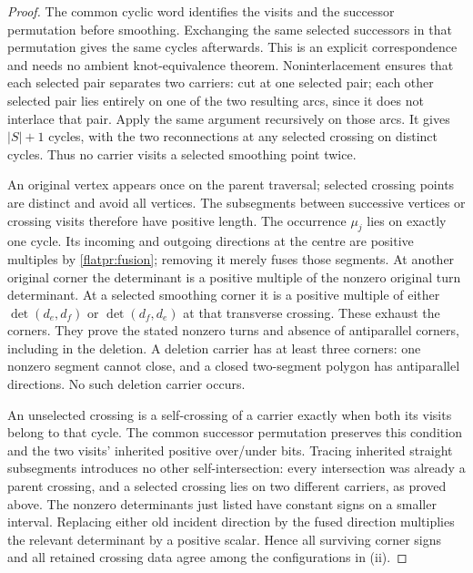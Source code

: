 \begin{proof}
The common cyclic word identifies the visits and the successor
permutation before smoothing. Exchanging the same selected successors
in that permutation gives the same cycles afterwards. This is an
explicit correspondence and needs no ambient knot-equivalence theorem.
Noninterlacement ensures that each selected pair separates two carriers:
cut at one selected pair; each other selected pair lies entirely on one
of the two resulting arcs, since it does not interlace that pair.
Apply the same argument recursively on those arcs. It gives $|S|+1$
cycles, with the two reconnections at any selected crossing on distinct
cycles. Thus no carrier visits a selected smoothing point twice.

An original vertex appears once on the parent traversal; selected
crossing points are distinct and avoid all vertices. The subsegments
between successive vertices or crossing visits therefore have positive
length. The occurrence $\mu_j$ lies on exactly one cycle. Its incoming
and outgoing directions at the centre are positive multiples by
\eqref{flatpr:fusion}; removing it merely fuses those segments.
At another original corner the determinant is a positive multiple of
the nonzero original turn determinant. At a selected smoothing corner
it is a positive multiple of either $\det(d_e,d_f)$ or
$\det(d_f,d_e)$ at that transverse crossing. These exhaust the corners.
They prove the stated nonzero turns and absence of antiparallel corners,
including in the deletion. A deletion carrier has at least three
corners: one nonzero segment cannot close, and a closed two-segment
polygon has antiparallel directions. No such deletion carrier occurs.

An unselected crossing is a self-crossing of a carrier exactly when
both its visits belong to that cycle. The common successor permutation
preserves this condition and the two visits' inherited positive
over/under bits. Tracing inherited straight subsegments introduces no
other self-intersection: every intersection was already a parent
crossing, and a selected crossing lies on two different carriers, as
proved above. The nonzero determinants just listed have constant
signs on a smaller interval. Replacing either old incident direction
by the fused direction multiplies the relevant determinant by a
positive scalar. Hence all surviving corner signs and all retained
crossing data agree among the configurations in (ii).


\end{proof}
